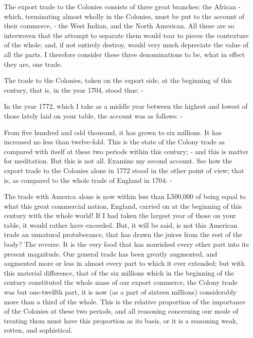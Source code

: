 The export trade to the Colonies consists of three great branches: the African - which, terminating almost wholly in the Colonies, must be put to the account of their commerce, - the West Indian, and the North American. All these are so interwoven that the attempt to separate them would tear to pieces the contexture of the whole; and, if not entirely destroy, would very much depreciate the value of all the parts. I therefore consider these three denominations to be, what in effect they are, one trade.\par

The trade to the Colonies, taken on the export side, at the beginning of this century, that is, in the year 1704, stood thus: -\par

In the year 1772, which I take as a middle year between the highest and lowest of those lately laid on your table, the account was as follows: -\par

From five hundred and odd thousand, it has grown to six millions. It has increased no less than twelve-fold. This is the state of the Colony trade as compared with itself at these two periods within this century; - and this is matter for meditation. But this is not all. Examine my second account. See how the export trade to the Colonies alone in 1772 stood in the other point of view; that is, as compared to the whole trade of England in 1704: -\par

The trade with America alone is now within less than L500,000 of being equal to what this great commercial nation, England, carried on at the beginning of this century with the whole world! If I had taken the largest year of those on your table, it would rather have exceeded. But, it will be said, is not this American trade an unnatural protuberance, that has drawn the juices from the rest of the body? The reverse. It is the very food that has nourished every other part into its present magnitude. Our general trade has been greatly augmented, and augmented more or less in almost every part to which it ever extended; but with this material difference, that of the six millions which in the beginning of the century constituted the whole mass of our export commerce, the Colony trade was but one-twelfth part, it is now (as a part of sixteen millions) considerably more than a third of the whole. This is the relative proportion of the importance of the Colonies at these two periods, and all reasoning concerning our mode of treating them must have this proportion as its basis, or it is a reasoning weak, rotten, and sophistical.\par

